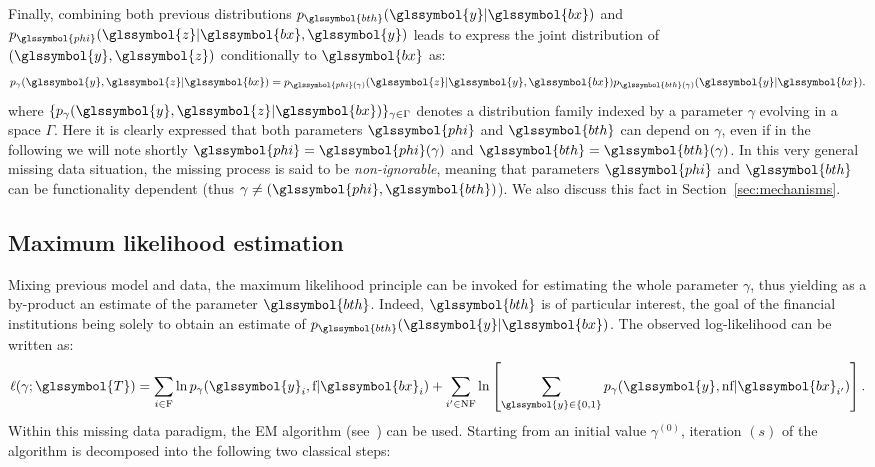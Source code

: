 Finally, combining both previous distributions $p_{\glssymbol{bth}}(\glssymbol{y}|\glssymbol{bx})$ and $p_{\glssymbol{phi}}(\glssymbol{z}|\glssymbol{bx},\glssymbol{y})$ leads to express the joint distribution of $(\glssymbol{y},\glssymbol{z})$ conditionally to $\glssymbol{bx}$ as:
\begin{equation}\label{eq:generative}
p_{\gamma}(\glssymbol{y},\glssymbol{z}|\glssymbol{bx}) = p_{\glssymbol{phi}(\gamma)}(\glssymbol{z}|\glssymbol{y},\glssymbol{bx})p_{\glssymbol{bth}(\gamma)}(\glssymbol{y}|\glssymbol{bx}).
\end{equation}
where $\{p_{\gamma}(\glssymbol{y},\glssymbol{z}|\glssymbol{bx})\}_{\gamma \in \Gamma}$ denotes a distribution family indexed by a parameter $\gamma$ evolving in a space $\Gamma$. Here it is clearly expressed that both parameters $\glssymbol{phi}$ and $\glssymbol{bth}$ can depend on $\gamma$, even if in the following we will note shortly $\glssymbol{phi}=\glssymbol{phi}(\gamma)$ and $\glssymbol{bth}=\glssymbol{bth}(\gamma)$. In this very general missing data situation, the missing process is said to be {\it non-ignorable}, meaning that parameters $\glssymbol{phi}$ and $\glssymbol{bth}$ can be functionality dependent (thus $\gamma\neq (\glssymbol{phi},\glssymbol{bth})$). We also discuss this fact in Section~\ref{sec:mechanisms}.

\subsection{Maximum likelihood estimation} 
\label{sec:EM}

Mixing previous model and data, the maximum likelihood principle can be invoked for estimating the whole parameter $\gamma$, thus yielding as a by-product an estimate of the parameter $\glssymbol{bth}$. Indeed, $\glssymbol{bth}$ is of particular interest, the goal of the financial institutions being solely to obtain an estimate of $p_{\glssymbol{bth}}(\glssymbol{y}|\glssymbol{bx})$. The observed log-likelihood can be written as:
\begin{equation}\label{eq:like.MNAR}
\ell(\gamma;\glssymbol{T}) = \sum_{i\in\text{F}}\ln p_{\gamma}(\glssymbol{y}_i,\text{f} | \glssymbol{bx}_i) + \sum_{i'\in\text{NF}} \ln \left[ \sum_{\glssymbol{y}\in\{0,1\}} p_{\gamma}(\glssymbol{y},\text{nf} | \glssymbol{bx}_{i'}) \right].
\end{equation}
Within this missing data paradigm, the EM algorithm (see~\cite{dempster1977maximum}) can be used. Starting from an initial value $\gamma^{(0)}$, iteration $(s)$ of the algorithm is decomposed into the following two classical steps:
